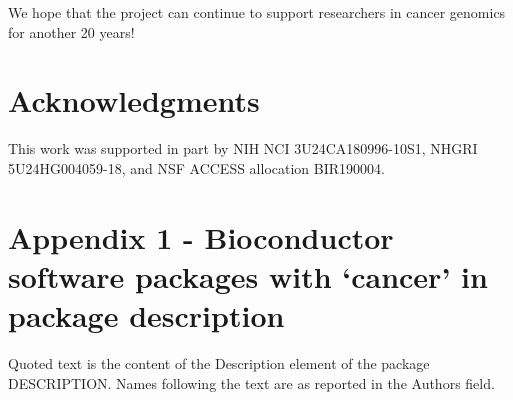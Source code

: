 We hope that the project can continue to support researchers in cancer
genomics for another 20 years!

\hypertarget{acknowledgments}{%
\section{Acknowledgments}\label{acknowledgments}}

This work was supported in part by NIH NCI 3U24CA180996-10S1, NHGRI 5U24HG004059-18, and NSF ACCESS allocation BIR190004.

\newpage

\hypertarget{app1}{%
\section{Appendix 1 - Bioconductor software packages with `cancer' in package description}\label{app1}}

Quoted text is the content of the Description element of the package DESCRIPTION. Names following the
text are as reported in the Authors field.

